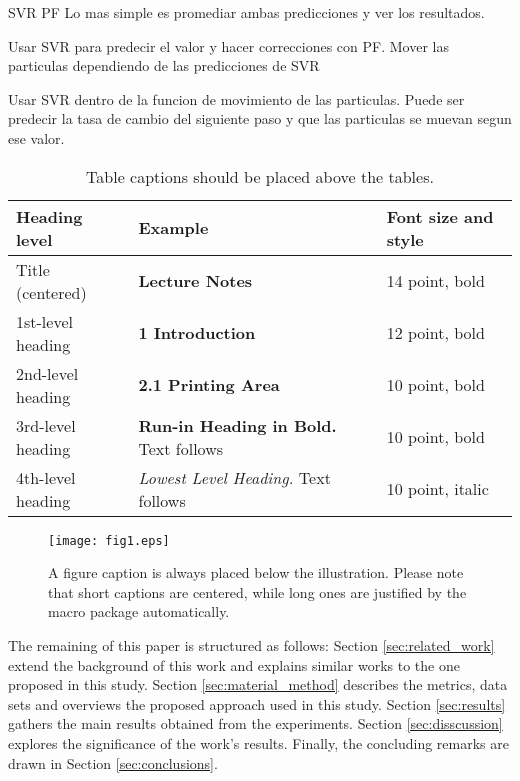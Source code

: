 SVR PF
Lo mas simple es promediar ambas predicciones y ver los resultados.

Usar SVR para predecir el valor y hacer correcciones con PF. Mover las particulas dependiendo de las predicciones de SVR

Usar SVR dentro de la funcion de movimiento de las particulas. Puede ser predecir la tasa de cambio del siguiente paso y que las particulas se muevan segun ese valor.




\begin{table}
\caption{Table captions should be placed above the
tables.}\label{tab1}
\begin{tabular}{|l|l|l|}
\hline
Heading level &  Example & Font size and style\\
\hline
Title (centered) &  {\Large\bfseries Lecture Notes} & 14 point, bold\\
1st-level heading &  {\large\bfseries 1 Introduction} & 12 point, bold\\
2nd-level heading & {\bfseries 2.1 Printing Area} & 10 point, bold\\
3rd-level heading & {\bfseries Run-in Heading in Bold.} Text follows & 10 point, bold\\
4th-level heading & {\itshape Lowest Level Heading.} Text follows & 10 point, italic\\
\hline
\end{tabular}
\end{table}


\begin{figure}
\texttt{[image: fig1.eps]}
\caption{A figure caption is always placed below the illustration.
Please note that short captions are centered, while long ones are
justified by the macro package automatically.} \label{fig1}
\end{figure}

The remaining of this paper is structured as follows: Section \ref{sec:related_work} extend the background of this work and explains similar works to the one proposed in this study. Section \ref{sec:material_method} describes the metrics, data sets and overviews the proposed approach used in this study. Section \ref{sec:results} gathers the main results obtained from the experiments. Section \ref{sec:disscussion} explores the significance of the work's results. Finally, the concluding remarks are drawn in Section \ref{sec:conclusions}. 